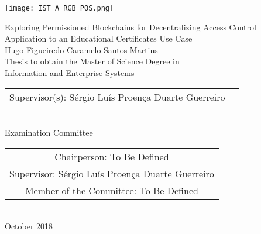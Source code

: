 \texttt{[image: IST\_A\_RGB\_POS.png]}

\begin{center}
    \vspace{2.5cm}

    \vspace{1.5cm}
    {\FontLb Exploring Permissioned Blockchains for Decentralizing Access Control} \\
    \vspace{0.3cm}
    {\FontMn Application to an Educational Certificates Use Case} \\
    \vspace{1.5cm}  
    {\FontMb Hugo Figueiredo Caramelo Santos Martins} \\
    \vspace{1.5cm}
    {\FontSn Thesis to obtain the Master of Science Degree in} \\
    \vspace{0.3cm}
    {\FontLb Information and Enterprise Systems} \\
    \vspace{1.5cm}
    {\FontSn %
        \begin{tabular}{ll}
            Supervisor(s): Sérgio Luís Proença Duarte Guerreiro
        \end{tabular} } \\
    \vspace{1.5cm}
    {\FontMb Examination Committee} \\
    \vspace{0.3cm}
    {\FontSn %
        \begin{tabular}{c}
            Chairperson:     To Be Defined \\ 
            Supervisor: Sérgio Luís Proença Duarte Guerreiro \\ 
            Member of the Committee: To Be Defined  
        \end{tabular} } \\
    \vspace*{\fill}
    {\FontMb October 2018}
\end{center}